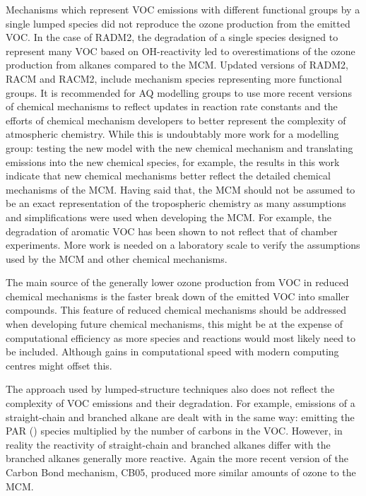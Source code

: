 Mechanisms which represent VOC emissions with different functional groups by a single lumped species did not reproduce the ozone production from the emitted VOC.
In the case of RADM2, the degradation of a single species designed to represent many VOC based on OH-reactivity led to overestimations of the ozone production from alkanes compared to the MCM.
Updated versions of RADM2, RACM and RACM2, include mechanism species representing more functional groups. 
It is recommended for AQ modelling groups to use more recent versions of chemical mechanisms to reflect updates in reaction rate constants and the efforts of chemical mechanism developers to better represent the complexity of atmospheric chemistry.
While this is undoubtably more work for a modelling group: testing the new model with the new chemical mechanism and translating emissions into the new chemical species, for example, the results in this work indicate that new chemical mechanisms better reflect the detailed chemical mechanisms of the MCM.
Having said that, the MCM should not be assumed to be an exact representation of the tropospheric chemistry as many assumptions and simplifications were used when developing the MCM.
For example, the degradation of aromatic VOC has been shown to not reflect that of chamber experiments.
More work is needed on a laboratory scale to verify the assumptions used by the MCM and other chemical mechanisms.

The main source of the generally lower ozone production from VOC in reduced chemical mechanisms is the faster break down of the emitted VOC into smaller compounds.
This feature of reduced chemical mechanisms should be addressed when developing future chemical mechanisms, this might be at the expense of computational efficiency as more species and reactions would most likely need to be included.
Although gains in computational speed with modern computing centres might offset this.

The approach used by lumped-structure techniques also does not reflect the complexity of VOC emissions and their degradation.
For example, emissions of a straight-chain and branched alkane are dealt with in the same way: emitting the PAR () species multiplied by the number of carbons in the VOC.
However, in reality the reactivity of straight-chain and branched alkanes differ with the branched alkanes generally more reactive. 
Again the more recent version of the Carbon Bond mechanism, CB05, produced more similar amounts of ozone to the MCM.


